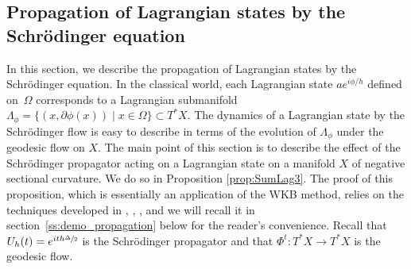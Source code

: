 \documentclass[JEP,XML,SOM,Unicode,published]{cedram}
\let\sep\mid
\theoremstyle{plain}
\theoremstyle{definition}
\begin{document}
\subsection{Propagation of Lagrangian states by the Schrödinger equation}\label{ss:propagation}

In this section, we describe the propagation of Lagrangian states by the Schrödinger equation. In the classical world, each Lagrangian state $ae^{i\phi/h}$ defined on~$\Omega$ corresponds to a Lagrangian submanifold $\Lambda_\phi=\{(x,\partial\phi(x))\sep x\in\Omega\}\subset T^*X$. The dynamics of a Lagrangian state by the Schrödinger flow is easy to describe in terms of the evolution of $\Lambda_\phi$ under the geodesic flow on $X$. The main point of this section is to describe the effect of the Schrödinger propagator acting on a Lagrangian state on a manifold $X$ of negative sectional curvature. We do so in Proposition \ref{prop:SumLag3}. The proof of this proposition, which is essentially an application of the WKB method, relies on the techniques developed in \cite{Anan}, \cite{AN}, \cite{NZ}, and we will recall it in section~\ref{ss:demo_propagation} below for the reader's convenience. Recall that $U_h(t)=e^{ith\sfrac{\Delta}{2}}$ is the Schrödinger propagator and that $\Phi^t:T^*X\to T^*X$ is the geodesic flow.
\end{document}
